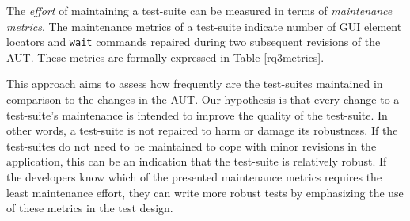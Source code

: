 The \textit{effort} of maintaining a test-suite can be measured in terms of \textit{maintenance metrics}. The maintenance metrics of a test-suite indicate number of  GUI element locators and \texttt{wait} commands repaired during two subsequent revisions of the AUT. These metrics are formally expressed in Table \ref{rq3metrics}. 

This approach aims to assess how frequently are the test-suites maintained in comparison to the changes in the AUT. Our hypothesis is that every change to a test-suite's maintenance is intended to improve the quality of the test-suite. In other words, a test-suite is not repaired to harm or damage its robustness. If the test-suites do not need to be maintained to cope with minor revisions in the application, this can be an indication that the test-suite is relatively robust. If the developers know which of the presented maintenance metrics requires the least maintenance effort, they can write more robust tests by emphasizing the use of these metrics in the test design. 

\begin{center}
\begin{table}
\centering
{}
  \captionsetup{justification=justified,
singlelinecheck=false}
\caption{Overview of the test-suite maintenance metrics. The first part shows the number of repaired \texttt{wait} conditions, the second part shows the number of repaired GUI element locators.}
\label{rq3metrics}
\end{table}
\end{center}
